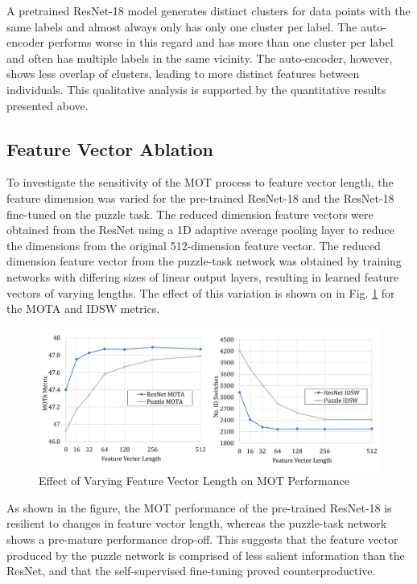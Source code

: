 \documentclass[10pt,twocolumn,letterpaper]{article}
\begin{document}
A pretrained ResNet-18 model generates distinct clusters for data points with the same labels and almost always only has only one cluster per label. The auto-encoder performs worse in this regard and has more than one cluster per label and often has multiple labels in the same vicinity. The auto-encoder, however, shows less overlap of clusters, leading to more distinct features between individuals. This qualitative analysis is supported by the quantitative results presented above. 

\subsection{Feature Vector Ablation}
To investigate the sensitivity of the MOT process to feature vector length, the feature dimension was varied for the pre-trained ResNet-18 and the ResNet-18 fine-tuned on the puzzle task. The reduced dimension feature vectors were obtained from the ResNet using a 1D adaptive average pooling layer to reduce the dimensions from the original 512-dimension feature vector. The reduced dimension feature vector from the puzzle-task network was obtained by training networks with differing sizes of linear output layers, resulting in learned feature vectors of varying lengths. The effect of this variation is shown on in Fig. \ref{fig:featvec} for the MOTA and IDSW metrics.

\begin{figure}[h!]
    \centering
    \includegraphics[width=\linewidth]{docs/reports/figs/feature_vec_effect.png}
    \caption{Effect of Varying Feature Vector Length on MOT Performance}
    \label{fig:featvec}
\end{figure}

As shown in the figure, the MOT performance of the pre-trained ResNet-18 is resilient to changes in feature vector length, whereas the puzzle-task network shows a pre-mature performance drop-off. This suggests that the feature vector produced by the puzzle network is comprised of less salient information than the ResNet, and that the self-supervised fine-tuning proved counterproductive.
\end{document}
